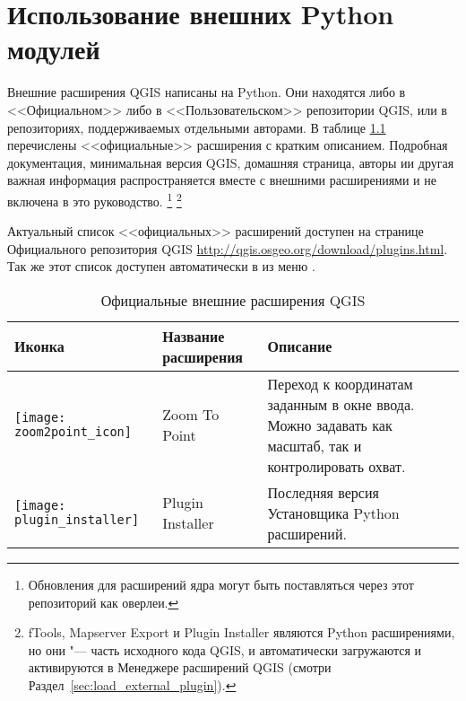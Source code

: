 
\chapter{Использование внешних Python модулей}\label{sec:external_plugins}


Внешние расширения QGIS написаны на Python. Они находятся либо в <<Официальном>>
либо в <<Пользовательском>> репозитории QGIS, или в репозиториях, поддерживаемых
отдельными авторами.
В таблице \ref{tab:external_plugins} перечислены <<официальные>> расширения с
кратким описанием.
Подробная документация, минимальная версия QGIS, домашняя страница, авторы
ии другая важная информация распространяется вместе с внешними расширениями
и не включена в это руководство.
\footnote{Обновления для расширений ядра могут быть поставляться через этот
репозиторий как оверлеи.}
\footnote{fTools, Mapserver Export и Plugin Installer являются Python
расширениями, но они "--- часть исходного кода QGIS, и автоматически
загружаются и активируются в Менеджере расширений QGIS
(смотри Раздел~\ref{sec:load_external_plugin}).}

Актуальный список <<официальных>> расширений доступен на странице Официального
репозитория QGIS \url{http://qgis.osgeo.org/download/plugins.html}. Так же
этот список доступен автоматически в 
из меню .

\begin{table}[H]
\centering
 \begin{tabular}{|l|l|p{8cm}|}
\hline \textbf{Иконка} & \textbf{Название расширения} & \textbf{Описание}\\
\hline
\texttt{[image: zoom2point\_icon]}
 & Zoom To Point \index{модули!Zoom To Point} & Переход к координатам
  заданным в окне ввода. Можно задавать как масштаб, так и
  контролировать охват.\\
\hline
\texttt{[image: plugin\_installer]}
 & Plugin Installer \index{модули!Plugin Installer} & Последняя версия Установщика Python расширений.\\
\hline
\end{tabular}
\caption{Официальные внешние расширения QGIS}\label{tab:external_plugins}
\end{table}

